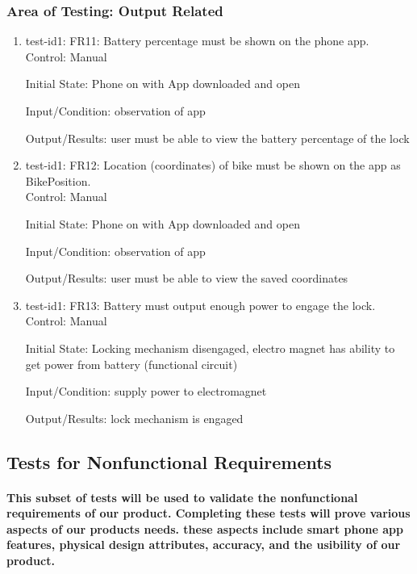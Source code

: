 \documentclass[12pt, titlepage]{article}
\begin{document}
\subsubsection{Area of Testing: Output Related}

\begin{enumerate}

\item{test-id1: FR11: Battery percentage must be shown on the phone app. \\}
Control: Manual 

Initial State: Phone on with App downloaded and open 

Input/Condition: observation of app 

Output/Results: user must be able to view the battery percentage of the lock 

\item{test-id1: FR12: Location (coordinates) of bike must be shown on the app as BikePosition. \\}
Control: Manual 

Initial State: Phone on with App downloaded and open 

Input/Condition: observation of app 

Output/Results: user must be able to view the saved coordinates 

\item{test-id1: FR13: Battery must output enough power to engage the lock. \\}
Control: Manual 

Initial State: Locking mechanism disengaged, electro magnet has ability to get power from battery (functional circuit) 

Input/Condition: supply power to electromagnet 

Output/Results: lock mechanism is engaged 

\end{enumerate}

\subsection{Tests for Nonfunctional Requirements}

\paragraph{This subset of tests will be used to validate the nonfunctional requirements of our product. Completing these tests will prove various aspects of our products needs. these aspects include smart phone app features, physical design attributes, accuracy, and the usibility of our product.}
\end{document}
